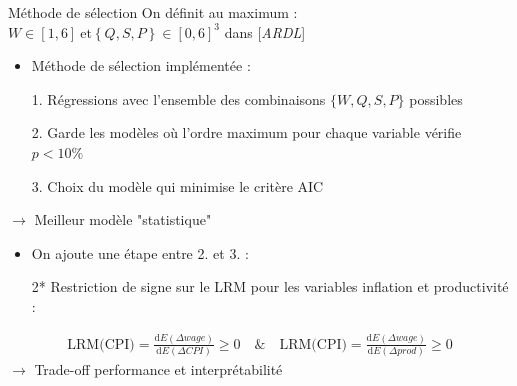 \documentclass[9pt, xcolor={dvipsnames}]{beamer}
\begin{document}
\begin{frame}[label=est]{Méthode de sélection}
  On définit au maximum : $W\in[1,6]\ \textrm{et} \left\{Q,S,P\right\}\in[0,6]^{3}$ dans [\textit{ARDL}]
  \begin{itemize}
    \item Méthode de sélection implémentée :
    \item[1.] Régressions avec l'ensemble des combinaisons $\{W,Q,S,P\}$ possibles
    \item[2.] Garde les modèles où l'ordre maximum pour chaque variable vérifie $p<10\%$ 
    \item[3.] Choix du modèle qui minimise le critère AIC
  \end{itemize}
  $\rightarrow$ Meilleur modèle "statistique"
  \vspace{.25cm}
  \begin{itemize}
    \item On ajoute une étape entre 2. et 3. :
    \item[2*] Restriction de signe sur le LRM pour les variables inflation et productivité :
  \end{itemize}
  \vspace{.25cm}
  \begin{align*}
    \textrm{LRM(CPI)} = \frac{\mathrm{d}E(\Delta wage)}{\mathrm{d}E(\Delta CPI)} \geq 0 \quad\textrm{\&}\quad \textrm{LRM(CPI)} = \frac{\mathrm{d}E(\Delta wage)}{\mathrm{d}E(\Delta prod)} \geq 0
  \end{align*}
  $\rightarrow$ Trade-off performance et interprétabilité
\end{frame}
\end{document}
